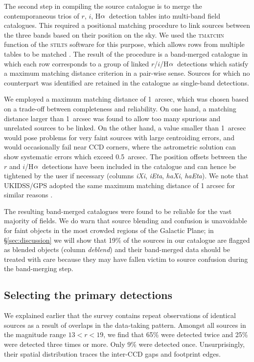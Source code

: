 \documentclass[useAMS,usenatbib]{mn2e}
\def\ha{\mbox{H$\rm \alpha$}}
\begin{document}
The second step in compiling the source catalogue
is to merge the contemporaneous trios
of $r$, $i$, \ha\ detection tables
into multi-band field catalogues.
This required a positional matching procedure 
to link sources between the three bands
based on their position on the sky.
We used the \textsc{tmatchn} function 
of the \textsc{stilts} software for this purpose,
which allows rows from multiple tables to be matched \citep{Taylor2006}.
The result of the procedure is a band-merged catalogue
in which each row corresponds to a group of linked $r$/$i$/\ha\ detections
which satisfy a maximum matching distance criterion in a pair-wise sense.
Sources for which no counterpart was identified
are retained in the catalogue as single-band detections.

We employed a maximum matching distance of 1~arcsec,
which was chosen based on a trade-off between 
completeness and reliability.
On one hand, a matching distance larger than 1~arcsec 
was found to allow too many spurious and unrelated sources 
to be linked. 
On the other hand, a value smaller than 1~arcsec 
would pose problems for very faint sources 
with large centroiding errors, 
and would occasionally fail near CCD corners,
where the astrometric solution can 
show systematic errors which exceed 0.5~arcsec.
The position offsets between the $r$ and $i$/\ha\ detections
have been included in the catalogue 
and can hence be tightened by the user if necessary
(columns \emph{iXi}, \emph{iEta}, \emph{haXi}, \emph{haEta}).
We note that UKIDSS/GPS adopted 
the same maximum matching distance of 1 arcsec
for similar reasons \citep{Hambly2008}.

The resulting band-merged catalogues were found
to be reliable for the vast majority of fields.
We do warn that source blending and confusion is unavoidable
for faint objects in the most crowded regions of the Galactic Plane;
in \S\ref{sec:discussion} we will show
that 19\% of the sources in our catalogue
are flagged as blended objects (column \emph{deblend})
and their band-merged data should be treated with care
because they may have fallen victim to source confusion
during the band-merging step.

\subsection{Selecting the primary detections}

We explained earlier that the survey contains repeat observations
of identical sources as a result of overlaps in the data-taking pattern.
Amongst all sources in the magnitude range $13<r<19$,
we find that 65\% were detected twice and 25\% were detected three times or more.
Only 9\% were detected once.
Unsurprisingly, their spatial distribution traces
the inter-CCD gaps and footprint edges.
\end{document}

